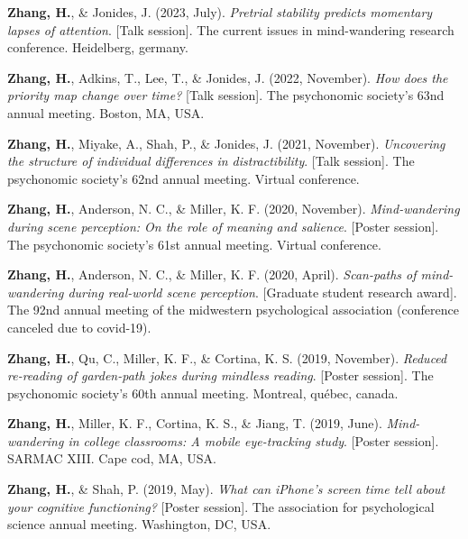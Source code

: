 \documentclass[11pt,a4paper,]{awesome-cv}
\begin{document}
\leavevmode{}%
\textbf{Zhang, H.}, \& Jonides, J. (2023, July). \emph{Pretrial
stability predicts momentary lapses of attention}. {[}Talk session{]}.
The current issues in mind-wandering research conference. Heidelberg,
germany.

\leavevmode{}%
\textbf{Zhang, H.}, Adkins, T., Lee, T., \& Jonides, J. (2022,
November). \emph{How does the priority map change over time?} {[}Talk
session{]}. The psychonomic society's 63nd annual meeting. Boston, MA,
USA.

\leavevmode{}%
\textbf{Zhang, H.}, Miyake, A., Shah, P., \& Jonides, J. (2021,
November). \emph{Uncovering the structure of individual differences in
distractibility}. {[}Talk session{]}. The psychonomic society's 62nd
annual meeting. Virtual conference.

\leavevmode{}%
\textbf{Zhang, H.}, Anderson, N. C., \& Miller, K. F. (2020, November).
\emph{Mind-wandering during scene perception: On the role of meaning and
salience}. {[}Poster session{]}. The psychonomic society's 61st annual
meeting. Virtual conference.

\leavevmode{}%
\textbf{Zhang, H.}, Anderson, N. C., \& Miller, K. F. (2020, April).
\emph{Scan-paths of mind-wandering during real-world scene perception}.
{[}Graduate student research award{]}. The 92nd annual meeting of the
midwestern psychological association (conference canceled due to
covid-19).

\leavevmode{}%
\textbf{Zhang, H.}, Qu, C., Miller, K. F., \& Cortina, K. S. (2019,
November). \emph{Reduced re-reading of garden-path jokes during mindless
reading}. {[}Poster session{]}. The psychonomic society's 60th annual
meeting. Montreal, québec, canada.

\leavevmode{}%
\textbf{Zhang, H.}, Miller, K. F., Cortina, K. S., \& Jiang, T. (2019,
June). \emph{Mind-wandering in college classrooms: A mobile eye-tracking
study}. {[}Poster session{]}. SARMAC XIII. Cape cod, MA, USA.

\leavevmode{}%
\textbf{Zhang, H.}, \& Shah, P. (2019, May). \emph{What can iPhone's
screen time tell about your cognitive functioning?} {[}Poster
session{]}. The association for psychological science annual meeting.
Washington, DC, USA.
\end{document}
